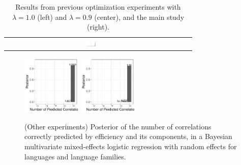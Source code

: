 \documentclass[10pt,twoside,lineno]{article}
\begin{document}
\begin{table}[hbt!]
\begin{center}
{\begin{tabular}{|c|ccc|c}
		&   \multirow{2}{*}{  \includegraphics[width=0.06\textwidth]{../results/correlations/figures/posteriors/posterior_Efficiency_xcomp.pdf}     }  \\
&&&\\ \hline
 \hline
\end{tabular}
}
	\end{center}
\caption{Results from previous optimization experiments with $\lambda=1.0$ (left) and $\lambda=0.9$ (center), and the main study (right).}\label{table:corr-resu}
\end{table}


% 


\begin{figure}[ht]
	\begin{center}
	\includegraphics[width=0.25\textwidth]{../results/correlations/figures/posterior-satisfied-universals-together-large-prior-efficiency09.pdf}
	\includegraphics[width=0.25\textwidth]{../results/correlations/figures/posterior-satisfied-universals-together-large-prior-efficiency10.pdf}
	\end{center}
	\caption{(Other experiments) Posterior of the number of correlations correctly predicted by efficiency and its components, in a Bayesian multivariate mixed-effects logistic regression with random effects for languages and language families.}\label{fig:posterior-prior}
\end{figure}






\end{document}
